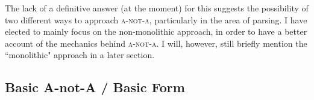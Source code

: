 \documentclass[12pt, UTF8]{article}
\begin{document}
The lack of a definitive answer (at the moment) for this suggests the possibility of two different ways to approach \textsc{a-not-a}, particularly in the area of parsing. I have elected to mainly focus on the non-monolithic approach, in order to have a better account of the mechanics behind \textsc{a-not-a}. I will, however, still briefly mention the ``monolithic" approach in a later section. 


%
%
%
%

%
%


\subsection {Basic A-not-A / Basic Form}
\end{document}
